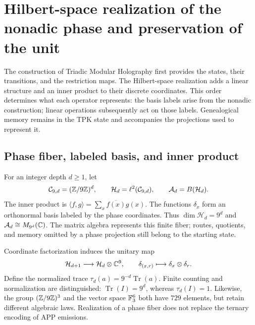 \section{Hilbert-space realization of the nonadic phase and preservation of the unit}
\label{iv:hilbert}

The construction of Triadic Modular Holography first provides
the states, their transitions, and the restriction maps. The Hilbert-space
realization adds a linear structure and an inner
product to their discrete coordinates. This order determines what each operator represents:
the basis labels arise from the nonadic construction;
linear operations subsequently act on those labels. Genealogical
memory remains in the TPK state and accompanies the projections
used to represent it.

\subsection{Phase fiber, labeled basis, and inner product}

For an integer depth \(d\geq1\), let
\begin{equation}
 \mathcal C_{9,d}=(\mathbb Z/9\mathbb Z)^d,
 \qquad \mathcal H_d=\ell^2(\mathcal C_{9,d}),
 \qquad \mathcal A_d=B(\mathcal H_d).
 \label{iv:eq:hilbert-finito}
\end{equation}
The inner product is
\(\langle f,g\rangle=\sum_x\overline{f(x)}g(x)\). The functions
\(\delta_x\) form an orthonormal basis labeled by the phase
coordinates. Thus \(\dim\mathcal H_d=9^d\) and
\(\mathcal A_d\cong M_{9^d}(\mathbb C)\). The matrix algebra represents
this finite fiber; routes, quotients, and memory omitted by a
phase projection still belong to the starting state.

Coordinate factorization induces the unitary map
\begin{equation}
 \mathcal H_{d+1}\longrightarrow\mathcal H_d\otimes\mathbb C^9,
 \qquad \delta_{(x,r)}\longmapsto\delta_x\otimes\delta_r.
 \label{iv:eq:factorizacion-hilbert}
\end{equation}
Define the normalized trace
\(\tau_d(a)=9^{-d}\operatorname{Tr}(a)\). Finite counting and
normalization are distinguished: \(\operatorname{Tr}(I)=9^d\), whereas
\(\tau_d(I)=1\). Likewise, the group \((\mathbb Z/9\mathbb Z)^3\) and the
vector space \(\mathbb F_3^6\) both have \(729\) elements, but
retain different algebraic laws. Realization of a phase
fiber does not replace the ternary encoding of APP emissions.

